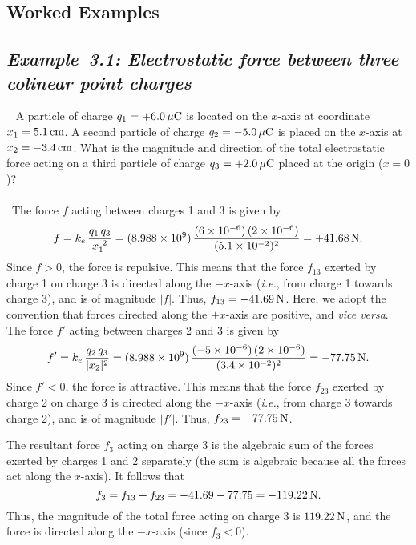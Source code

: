 \subsection{Worked Examples}
\subsection*{\em Example~3.1: Electrostatic force between three colinear point charges}
~ A particle of charge $q_1=+6.0\,\mu{\rm C}$ is located
on the $x$-axis at coordinate $x_1=5.1\,{\rm cm}$. A second particle of
charge $q_2=-5.0\,\mu{\rm C}$ is placed on the $x$-axis at $x_2=-3.4\,{\rm cm}$. What is
the magnitude and direction of the total electrostatic force acting on a third particle
of charge $q_3=+2.0\,\mu{\rm C}$ placed at the origin ($x=0$)?\\
~\\
~The force $f$ acting  between charges 1 and 3 is
given by
$$
f = k_e\, \frac{q_1 \,q_3}{x_1^{~2}} = (8.988\times 10^9)\,\frac{(6\times 10^{-6})\,(2\times
10^{-6})}{(5.1\times 10^{-2})^2} = 
+41.68\,{\rm N}.
$$
Since $f>0$, the force is repulsive. This means that the force $f_{13}$ exerted by charge
1 on charge 3 is directed along the $-x$-axis 
({\em i.e.}, from charge 1 towards charge 3), and is of magnitude $|f|$. Thus,
$f_{13} = - 41.69\,{\rm N}$. Here, we adopt the convention that forces directed
along the $+x$-axis are positive, and {\em vice versa}. The force $f'$ acting between charges 2 and 3
is given by
$$
f' = k_e\, \frac{q_2 \,q_3}{|x_2|^{2}} = (8.988\times 10^9)\,\frac{(-5\times 10^{-6})\,(2\times
10^{-6})}{(3.4\times 10^{-2})^2} = 
-77.75\,{\rm N}.
$$
Since $f'<0$, the force is attractive. This means that the force $f_{23}$ exerted
by charge 2 on charge 3 is directed along the $-x$-axis ({\em i.e.}, from
charge 3 towards charge 2), and is of magnitude $|f'|$. Thus,
$f_{23} = - 77.75\,{\rm N}$. 

The resultant force $f_3$ acting on charge 3 is the
algebraic sum of the forces exerted by charges 1 and 2 separately (the sum is algebraic
because all the 
forces act along the $x$-axis). It follows that
$$
f_3 = f_{13} + f_{23} = - 41.69 - 77.75 =-119.22\,{\rm N}.
$$
Thus, the magnitude of the total force acting on charge 3 is
$119.22\,{\rm N}$, and the force is directed along the $-x$-axis (since $f_3<0$).

